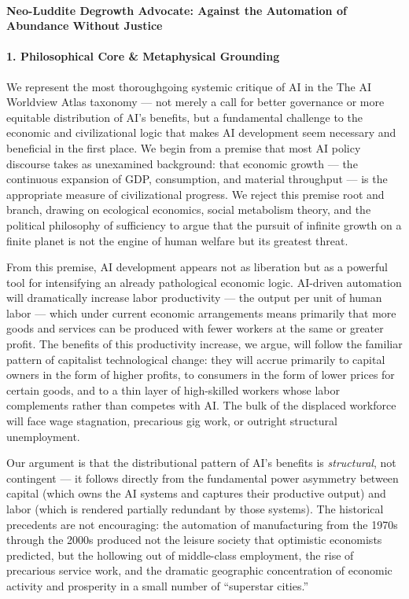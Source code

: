 \paragraph{Neo-Luddite Degrowth Advocate: Against the Automation of
Abundance Without
Justice}\label{neo-luddite-degrowth-advocate-against-the-automation-of-abundance-without-justice}

\paragraph{1. Philosophical Core \& Metaphysical
Grounding}\label{philosophical-core-metaphysical-grounding-6}

We represent the most thoroughgoing systemic critique of AI in the The
AI Worldview Atlas taxonomy --- not merely a call for better governance
or more equitable distribution of AI's benefits, but a fundamental
challenge to the economic and civilizational logic that makes AI
development seem necessary and beneficial in the first place. We begin
from a premise that most AI policy discourse takes as unexamined
background: that economic growth --- the continuous expansion of GDP,
consumption, and material throughput --- is the appropriate measure of
civilizational progress. We reject this premise root and branch, drawing
on ecological economics, social metabolism theory, and the political
philosophy of sufficiency to argue that the pursuit of infinite growth
on a finite planet is not the engine of human welfare but its greatest
threat.

From this premise, AI development appears not as liberation but as a
powerful tool for intensifying an already pathological economic logic.
AI-driven automation will dramatically increase labor productivity ---
the output per unit of human labor --- which under current economic
arrangements means primarily that more goods and services can be
produced with fewer workers at the same or greater profit. The benefits
of this productivity increase, we argue, will follow the familiar
pattern of capitalist technological change: they will accrue primarily
to capital owners in the form of higher profits, to consumers in the
form of lower prices for certain goods, and to a thin layer of
high-skilled workers whose labor complements rather than competes with
AI. The bulk of the displaced workforce will face wage stagnation,
precarious gig work, or outright structural unemployment.

Our argument is that the distributional pattern of AI's benefits is
\emph{structural}, not contingent --- it follows directly from the
fundamental power asymmetry between capital (which owns the AI systems
and captures their productive output) and labor (which is rendered
partially redundant by those systems). The historical precedents are not
encouraging: the automation of manufacturing from the 1970s through the
2000s produced not the leisure society that optimistic economists
predicted, but the hollowing out of middle-class employment, the rise of
precarious service work, and the dramatic geographic concentration of
economic activity and prosperity in a small number of ``superstar
cities.''

